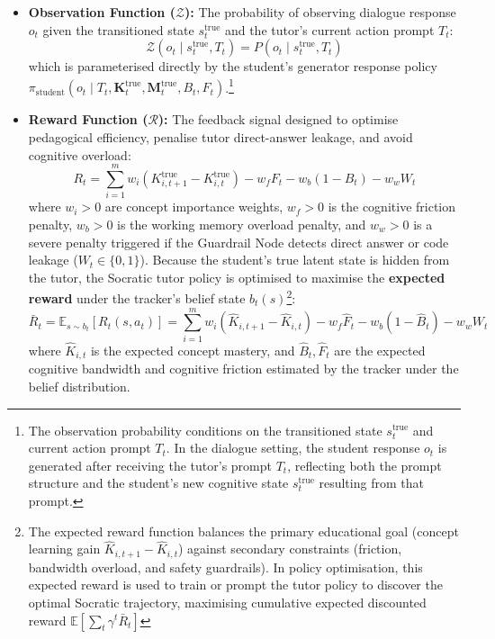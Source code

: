 \begin{itemize}
    \item \textbf{Observation Function ($\mathcal{Z}$):} The probability of observing dialogue response $o_t$ given the transitioned state $s_t^{\text{true}}$ and the tutor's current action prompt $T_t$:
    \begin{equation}
        \mathcal{Z}(o_t \mid s_t^{\text{true}}, T_t) = P(o_t \mid s_t^{\text{true}}, T_t)
    \end{equation}
    which is parameterised directly by the student's generator response policy $\pi_{\text{student}}(o_t \mid T_t, \mathbf{K}_t^{\text{true}}, \mathbf{M}_t^{\text{true}}, B_t, F_t)$.\footnote{The observation probability conditions on the transitioned state $s_t^{\text{true}}$ and current action prompt $T_t$. In the dialogue setting, the student response $o_t$ is generated after receiving the tutor's prompt $T_t$, reflecting both the prompt structure and the student's new cognitive state $s_t^{\text{true}}$ resulting from that prompt.}
    \item \textbf{Reward Function ($\mathcal{R}$):} The feedback signal designed to optimise pedagogical efficiency, penalise tutor direct-answer leakage, and avoid cognitive overload:
    \begin{equation}
        R_t = \sum_{i=1}^m w_i \left(K^{\text{true}}_{i, t+1} - K^{\text{true}}_{i, t}\right) - w_f F_t - w_b (1 - B_t) - w_w W_t
    \end{equation}
    where $w_i > 0$ are concept importance weights, $w_f > 0$ is the cognitive friction penalty, $w_b > 0$ is the working memory overload penalty, and $w_w > 0$ is a severe penalty triggered if the Guardrail Node detects direct answer or code leakage ($W_t \in \{0, 1\}$). Because the student's true latent state is hidden from the tutor, the Socratic tutor policy is optimised to maximise the \textbf{expected reward} under the tracker's belief state $b_t(s)$\footnote{The expected reward function balances the primary educational goal (concept learning gain $\hat{K}_{i, t+1} - \hat{K}_{i, t}$) against secondary constraints (friction, bandwidth overload, and safety guardrails). In policy optimisation, this expected reward is used to train or prompt the tutor policy to discover the optimal Socratic trajectory, maximising cumulative expected discounted reward $\mathbb{E}[\sum_t \gamma^t \bar{R}_t]$}:
    \begin{equation}
        \bar{R}_t = \mathbb{E}_{s \sim b_t}[R_t(s, a_t)] = \sum_{i=1}^m w_i \left(\hat{K}_{i, t+1} - \hat{K}_{i, t}\right) - w_f \hat{F}_t - w_b (1 - \hat{B}_t) - w_w W_t
    \end{equation}
    where $\hat{K}_{i, t}$ is the expected concept mastery, and $\hat{B}_t, \hat{F}_t$ are the expected cognitive bandwidth and cognitive friction estimated by the tracker under the belief distribution.
    

\end{itemize}
